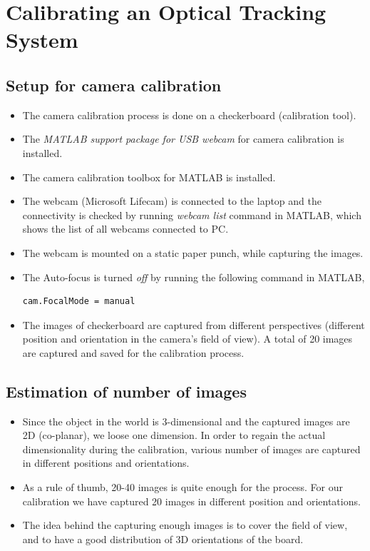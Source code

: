\documentclass[11pt,a4paper]{article}
\begin{document}
\newpage
\section{Calibrating an Optical Tracking System}
\subsection{Setup for camera calibration }
\begin{itemize}
\item The camera calibration process is done on a checkerboard (calibration tool).
\item The \textit{MATLAB support package for USB webcam} for camera calibration is installed.
\item The camera calibration toolbox for MATLAB is installed.
\item The webcam (Microsoft Lifecam) is connected to the laptop and the connectivity is checked by running \textit{webcam list} command in MATLAB, which shows the list of all webcams connected to PC.
\item The webcam is mounted on a static paper punch, while capturing the images.
\item The Auto-focus is turned \textit{off} by running the following command in MATLAB,
\begin{lstlisting}
cam.FocalMode = manual
\end{lstlisting}
\item The images of checkerboard are captured from different perspectives (different position and orientation in the camera's field of view). A total of 20 images are captured and saved for the calibration process.
\end{itemize}

\subsection{Estimation of number of images}
\begin{itemize}
\item Since the object in the world is 3-dimensional and the captured images are 2D (co-planar), we loose one dimension. In order to regain the actual dimensionality during the calibration, various number of images are captured in different positions and orientations. 
\item As a rule of thumb, 20-40 images is quite enough for the process. For our calibration we have captured 20 images in different position and orientations. 
\item The idea behind the capturing enough images is to cover the field of view, and to have a good distribution of 3D orientations of the board. 
\end{itemize}
\end{document}
